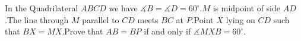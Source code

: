 In the Quadrilateral $ABCD$ we have $ \measuredangle B=\measuredangle D = 60^\circ $.$M$ is midpoint of side $AD$.The line through $M$ parallel to $CD$ meets $BC$ at $P$.Point $X$ lying on $CD$ such that $BX=MX$.Prove that $AB=BP$ if and only if $\measuredangle MXB=60^\circ$.
